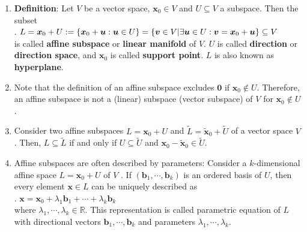 \begin{enumerate}
    \item \textbf{Definition}: Let $V$ be a vector space, $\bm{x}_0 \in V$ and $U \subseteq V$ a subspace. 
    Then the subset 
    \hfill \cite{mfml/book/mml/Deisenroth-Faisal-Ong}
    \\
    .\hfill
    $
        L 
        = \bm{x}_0 + U 
        := \left\{\bm{x}_0 + \bm{u} : \bm{u} \in  U\right\}
        = \left\{\bm{v} \in  V | \exists \bm{u} \in  U : \bm{v} = \bm{x}_0 + \bm{u}\right\} \subseteq V
    $
    \hfill \cite{mfml/book/mml/Deisenroth-Faisal-Ong}
    \\
    is called \textbf{affine subspace} or \textbf{linear manifold} of $V$.
    $U$ is called \textbf{direction} or \textbf{direction space}, and $\bm{x}_0$ is called \textbf{support point}.
    $L$ is also known as \textbf{hyperplane}.
    \hfill \cite{mfml/book/mml/Deisenroth-Faisal-Ong}

    \item Note that the definition of an affine subspace excludes $\bm{0}$ if $\bm{x}_0 \notin U$.
    Therefore, an affine subspace is not a (linear) subspace (vector subspace) of $V$ for $\bm{x}_0 \notin U$.
    \hfill \cite{mfml/book/mml/Deisenroth-Faisal-Ong}

    \item Consider two affine subspaces $L = \bm{x}_0 + U$ and $\tilde{L} = \tilde{\bm{x}}_0 + \tilde{U}$ of a vector space $V$ . 
    Then, $L \subseteq \tilde{L}$ if and only if $U \subseteq \tilde{U}$ and $\bm{x}_0 - \tilde{\bm{x}}_0 \in \tilde{U}$.
    \hfill \cite{mfml/book/mml/Deisenroth-Faisal-Ong}

    \item Affine subspaces are often described by parameters: Consider a $k$-dimensional affine space $L = \bm{x}_0 + U$ of $V$ . 
    If $(\bm{b}_1, \cdots , \bm{b}_k)$ is an ordered basis of $U$, then every element $\bm{x} \in L$ can be uniquely described as
    \hfill \cite{mfml/book/mml/Deisenroth-Faisal-Ong}
    \\
    .\hfill
    $
        \bm{x} = \bm{x}_0 + \lambda _1 \bm{b}_1 + \cdots + \lambda _k \bm{b}_k
    $
    \hfill \cite{mfml/book/mml/Deisenroth-Faisal-Ong}
    \\
    where $\lambda _1, \cdots , \lambda _k \in \mathbb{R}$. 
    This representation is called parametric equation of $L$ with directional vectors $\bm{b}_1, \cdots , \bm{b}_k$ and parameters $\lambda _1, \cdots , \lambda _k$.
    \hfill \cite{mfml/book/mml/Deisenroth-Faisal-Ong}


\end{enumerate}
